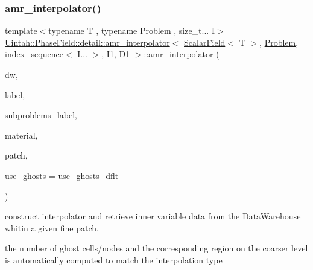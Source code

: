 \subsubsection{\texorpdfstring{amr\+\_\+interpolator()}{amr\_interpolator()}\hspace{0.1cm}{\footnotesize\ttfamily [3/4]}}
{\footnotesize\ttfamily template$<$typename T , typename Problem , size\+\_\+t... I$>$ \\
\hyperlink{classUintah_1_1PhaseField_1_1detail_1_1amr__interpolator}{Uintah\+::\+Phase\+Field\+::detail\+::amr\+\_\+interpolator}$<$ \hyperlink{structUintah_1_1PhaseField_1_1ScalarField}{Scalar\+Field}$<$ T $>$, \hyperlink{classUintah_1_1PhaseField_1_1Problem}{Problem}, \hyperlink{namespaceUintah_1_1PhaseField_a237de804d99512e50613aff7c94a9461}{index\+\_\+sequence}$<$ I... $>$, \hyperlink{namespaceUintah_1_1PhaseField_a547ce3002aa97fbd3ef3192a6eec8406a66f19efe774b0d2b6e5844eb2d83d305}{I1}, \hyperlink{namespaceUintah_1_1PhaseField_a12bfc68444894dffdf0cb8d9cf0cc76aa24dcc0ba6bcb45bc6f503b1b538c6809}{D1} $>$\+::\hyperlink{classUintah_1_1PhaseField_1_1detail_1_1amr__interpolator}{amr\+\_\+interpolator} (\begin{DoxyParamCaption}\item[{Data\+Warehouse $\ast$}]{dw,  }\item[{const typename \hyperlink{structUintah_1_1PhaseField_1_1ScalarField_a7a77875e030da64c47ce9f6c22a06959}{Field\+::label\+\_\+type} \&}]{label,  }\item[{const Var\+Label $\ast$}]{subproblems\+\_\+label,  }\item[{int}]{material,  }\item[{const Patch $\ast$}]{patch,  }\item[{bool}]{use\+\_\+ghosts = {\ttfamily \hyperlink{classUintah_1_1PhaseField_1_1detail_1_1amr__interpolator_3_01ScalarField_3_01T_01_4_00_01Problem71844444bc14a03c0566689b6b502040_ad1c55bf968b88ce13f275aa631a69cf7}{use\+\_\+ghosts\+\_\+dflt}} }\end{DoxyParamCaption})\hspace{0.3cm}{\ttfamily [inline]}}



construct interpolator and retrieve inner variable data from the Data\+Warehouse whitin a given fine patch. 

the number of ghost cells/nodes and the corresponding region on the coarser level is automatically computed to match the interpolation type


